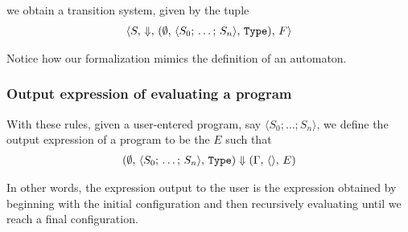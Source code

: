 \documentclass{article}
\begin{document}
we obtain a transition system, given by the tuple
\begin{align*}
  \langle S, \, \Downarrow, \, 
  (\emptyset, \, \langle S_0; \, \dots; \, S_n \rangle, \, \texttt{Type}), \, F \rangle
\end{align*}

Notice how our formalization mimics the definition of an automaton.

\subsubsection{Output expression of evaluating a program}
With these rules, given a user-entered program, say $\langle S_0;
\dots; S_n \rangle$, we define the
output expression of a program to be the $E$ such that
\begin{align*}
  (\emptyset, \, \langle S_0; \, \dots; \, S_n \rangle, \, \texttt{Type}) \Downarrow
  (\Gamma, \, \langle \rangle, \, E)
\end{align*}

In other words, the expression output to the user is the expression obtained by
beginning with the initial configuration and then recursively evaluating
until we reach a final configuration.





\end{document}
